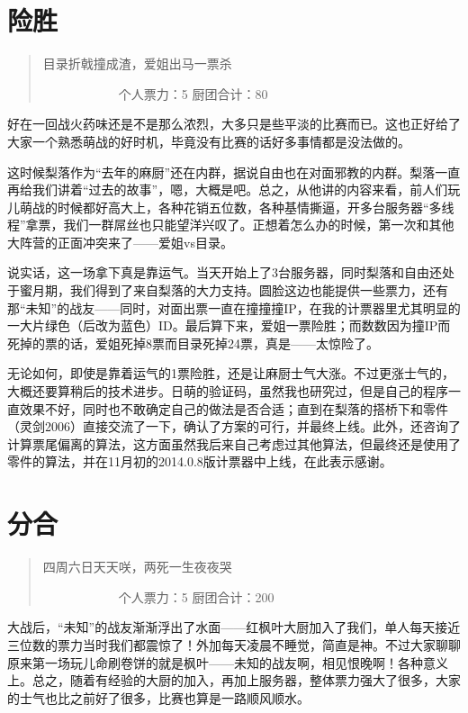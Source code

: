 \section{险胜}
\begin{quote}
目录折戟撞成渣，爱姐出马一票杀

　　　　　　个人票力：5 厨团合计：80
\end{quote}

好在一回战火药味还是不是那么浓烈，大多只是些平淡的比赛而已。这也正好给了大家一个熟悉萌战的好时机，毕竟没有比赛的话好多事情都是没法做的。

这时候梨落作为“去年的麻厨”还在内群，据说自由也在对面邪教的内群。梨落一直再给我们讲着“过去的故事”，嗯，大概是吧。总之，从他讲的内容来看，前人们玩儿萌战的时候都好高大上，各种花销五位数，各种基情撕逼，开多台服务器“多线程”拿票，我们一群屌丝也只能望洋兴叹了。正想着怎么办的时候，第一次和其他大阵营的正面冲突来了——爱姐vs目录。

说实话，这一场拿下真是靠运气。当天开始上了3台服务器，同时梨落和自由还处于蜜月期，我们得到了来自梨落的大力支持。圆脸这边也能提供一些票力，还有那“未知”的战友——同时，对面出票一直在撞撞撞IP，在我的计票器里尤其明显的一大片绿色（后改为蓝色）ID。最后算下来，爱姐一票险胜；而数数因为撞IP而死掉的票的话，爱姐死掉8票而目录死掉24票，真是——太惊险了。

无论如何，即使是靠着运气的1票险胜，还是让麻厨士气大涨。不过更涨士气的，大概还要算稍后的技术进步。日萌的验证码，虽然我也研究过，但是自己的程序一直效果不好，同时也不敢确定自己的做法是否合适；直到在梨落的搭桥下和零件（灵剑2006）直接交流了一下，确认了方案的可行，并最终上线。此外，还咨询了计算票尾偏离的算法，这方面虽然我后来自己考虑过其他算法，但最终还是使用了零件的算法，并在11月初的2014.0.8版计票器中上线，在此表示感谢。


\section{分合}
\begin{quote}
四周六日天天咲，两死一生夜夜哭

　　　　　　个人票力：5 厨团合计：200
\end{quote}

大战后，“未知”的战友渐渐浮出了水面——红枫叶大厨加入了我们，单人每天接近三位数的票力当时我们都震惊了！外加每天凌晨不睡觉，简直是神。不过大家聊聊原来第一场玩儿命刷卷饼的就是枫叶——未知的战友啊，相见恨晚啊！各种意义上。总之，随着有经验的大厨的加入，再加上服务器，整体票力强大了很多，大家的士气也比之前好了很多，比赛也算是一路顺风顺水。

